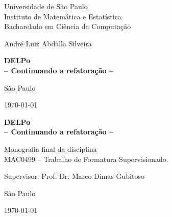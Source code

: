 \documentclass[12pt,twoside,a4paper,openany]{book}
\begin{document}
    \frontmatter
    \fancyhead[RO]{{\footnotesize\rightmark}\hspace{2em}\thepage}
    \setcounter{tocdepth}{2}
    \fancyhead[LE]{\thepage\hspace{2em}\footnotesize{\leftmark}}
    \fancyhead[RE,LO]{}
    \fancyhead[RO]{{\footnotesize\rightmark}\hspace{2em}\thepage}

    \onehalfspacing  %


    \thispagestyle{empty}
    \begin{center}
        \vspace*{2.3cm}
        Universidade de São Paulo\\
        Instituto de Matemática e Estatística \\
        Bacharelado  em Ciência da Computação


        \vspace*{3cm}
        \Large{André Luiz Abdalla Silveira}


        \vspace{3cm}
        \textbf{\Large{DELPo \\
             -- Continuando a refatoração --}}


        \vskip 5cm
        \normalsize{São Paulo}

        \normalsize{\today}
    \end{center}
    \newpage
    \thispagestyle{empty}
    \begin{center}
        \vspace*{2.3 cm}
        \textbf{\Large{DELPo \\
        -- Continuando a refatoração --}}
        \vspace*{2 cm}
    \end{center}

    \vskip 2cm

    \begin{flushright}
        Monografia final da disciplina \\
        MAC0499 -- Trabalho de Formatura Supervisionado.
    \end{flushright}

    \vskip 5cm

    \begin{center}
        Supervisor: Prof. Dr. Marco Dimas Gubitoso

        \vskip 5cm
        \normalsize{São Paulo}

        \normalsize{\today}
    \end{center}
    \pagebreak
\end{document}
